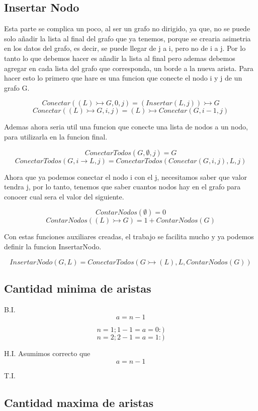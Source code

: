 \documentclass{article}
\begin{document}
\subsection{Insertar Nodo}
Esta parte se complica un poco, al ser un grafo no dirigido, ya que, no se puede
solo añadir la lista al final del grafo que ya tenemos, porque se crearia 
asimetria en los datos del grafo, es decir, se puede llegar de j a i, pero 
no de i a j.
Por lo tanto lo que debemos hacer es añadir la lista al final pero ademas 
debemos agregar en cada lista del grafo que corresponda, un borde a la nueva 
arista.
Para hacer esto lo primero que hare es una funcion que conecte el nodo i y j
de un grafo G.

\[ Conectar((L) \rightarrowtail G, 0, j) = (Insertar(L, j)) \rightarrowtail G \]
\[ Conectar((L) \rightarrowtail G, i, j) = (L) \rightarrowtail Conectar(G, i-1, j) \]

Ademas ahora seria util una funcion que conecte una lista de nodos a un nodo,
para utilizarla en la funcion final.

\[ ConectarTodos(G, \emptyset, j) = G  \]
\[ ConectarTodos(G, i \rightarrow L, j) = ConectarTodos(Conectar(G, i, j), L, j)  \]

Ahora que ya podemos conectar el nodo i con el j, necesitamos saber que valor 
tendra j, por lo tanto, tenemos que saber cuantos nodos hay en el grafo para 
conocer cual sera el valor del siguiente.

\[ ContarNodos(\emptyset) = 0 \]
\[ ContarNodos((L) \rightarrowtail G) = 1 + ContarNodos(G) \]

Con estas funciones auxiliares creadas, el trabajo se facilita mucho y ya 
podemos definir la funcion InsertarNodo.

\[ InsertarNodo(G, L) = ConectarTodos(G \rightarrowtail (L), L, ContarNodos(G)) \]

\subsection{Cantidad minima de aristas}

B.I.
\[ a = n - 1 \]

\[n = 1; 1 - 1 = a = 0 :)\]
\[n = 2; 2 - 1 = a = 1 :)\]

H.I.
Asumimos correcto que
\[ a = n - 1 \]

T.I.

\subsection{Cantidad maxima de aristas}
\end{document}
